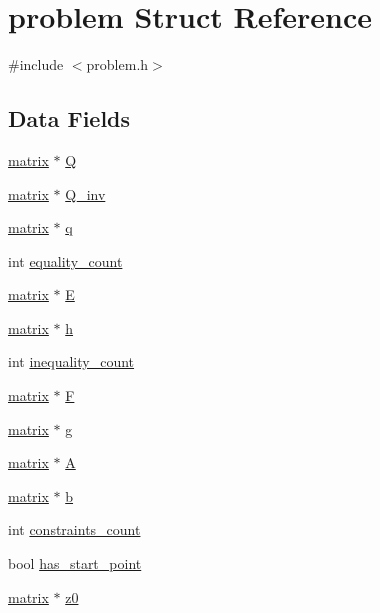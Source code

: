 \hypertarget{structproblem}{}\section{problem Struct Reference}
\label{structproblem}


{\ttfamily \#include $<$problem.\+h$>$}

\subsection*{Data Fields}
\begin{DoxyCompactItemize}
\item 
\hyperlink{structmatrix}{matrix} $\ast$ \hyperlink{structproblem_ae50fecd2794ca5844d6d01efcf17294c}{Q}
\item 
\hyperlink{structmatrix}{matrix} $\ast$ \hyperlink{structproblem_a54cc974fe14b21225c2a940ed2bf1039}{Q\+\_\+inv}
\item 
\hyperlink{structmatrix}{matrix} $\ast$ \hyperlink{structproblem_a7755407fcbd4345b31d64bbc181af35a}{q}
\item 
int \hyperlink{structproblem_aa7487cc373ced36ac9f1d9ad0f7aec6a}{equality\+\_\+count}
\item 
\hyperlink{structmatrix}{matrix} $\ast$ \hyperlink{structproblem_a1fc7c4b0ad7cae12ae26a243648cec36}{E}
\item 
\hyperlink{structmatrix}{matrix} $\ast$ \hyperlink{structproblem_a8e142e0ead965e30c731cac0c81f0546}{h}
\item 
int \hyperlink{structproblem_a0baf6f65eaae279a86d187ef201c1320}{inequality\+\_\+count}
\item 
\hyperlink{structmatrix}{matrix} $\ast$ \hyperlink{structproblem_a9cba4c914ccb68d2fa56a599049b5d88}{F}
\item 
\hyperlink{structmatrix}{matrix} $\ast$ \hyperlink{structproblem_ab6856d3e27905889927bce25e9c93d37}{g}
\item 
\hyperlink{structmatrix}{matrix} $\ast$ \hyperlink{structproblem_ac56453eb618f2ce98f20d91442a5690b}{A}
\item 
\hyperlink{structmatrix}{matrix} $\ast$ \hyperlink{structproblem_a844487a6c95b5fd7a6c768f5fdaa24c0}{b}
\item 
int \hyperlink{structproblem_af4bd8be9dbe65720b067dc893e57481a}{constraints\+\_\+count}
\item 
bool \hyperlink{structproblem_a2596cd297f65ddbda474ea881a09a9e9}{has\+\_\+start\+\_\+point}
\item 
\hyperlink{structmatrix}{matrix} $\ast$ \hyperlink{structproblem_a2f7d9aba872a4653770df8dd6e3826a1}{z0}

\end{DoxyCompactItemize}
